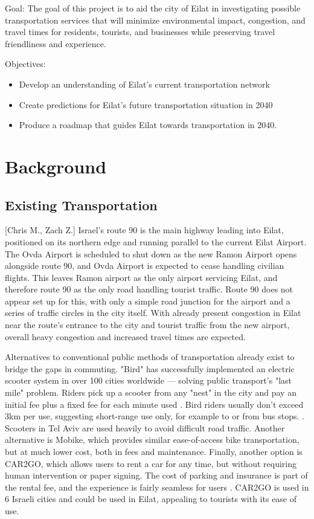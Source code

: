 \documentclass[12pt]{article}                         %
\begin{document}
Goal: The goal of this project is to aid the city of Eilat in investigating possible transportation services that will minimize environmental impact, congestion, and travel times for residents, tourists, and businesses while preserving travel friendliness and experience.

Objectives:
\begin{itemize}
    \item Develop an understanding of Eilat's current transportation network
    
    \item Create predictions for Eilat's future transportation situation in 2040
    
    \item Produce a roadmap that guides Eilat towards transportation in 2040.
\end{itemize}

\newpage
\section{Background}

\subsection{Existing Transportation}[Chris M., Zach Z.]
Israel's route 90 is the main highway leading into Eilat, positioned on its northern edge and running parallel to the current Eilat Airport. The Ovda Airport is scheduled to shut down as the new Ramon Airport opens alongside route 90, and Ovda Airport is expected to cease handling civilian flights. This leaves Ramon airport as the only airport servicing Eilat, and therefore route 90 as the only road handling tourist traffic. Route 90 does not appear set up for this, with only a simple road junction for the airport and a series of traffic circles in the city itself. With already present congestion in Eilat near the route's entrance to the city and tourist traffic from the new airport, overall heavy congestion and increased travel times are expected.

Alternatives to conventional public methods of transportation already exist to bridge the gaps in commuting. "Bird" has successfully implemented an electric scooter system in over 100 cities worldwide --- solving public transport's "last mile" problem. Riders pick up a scooter from any "nest" in the city and pay an initial fee plus a fixed fee for each minute used \cite{BirdIsrael}. Bird riders usually don't exceed 3km per use, suggesting short-range use only, for example to or from bus stops. \cite{MichaelRaz-Chaimovich2018BirdGlobes}. Scooters in Tel Aviv are used heavily to avoid difficult road traffic. Another alternative is Mobike, which provides similar ease-of-access bike transportation, but at much lower cost, both in fees and maintenance. Finally, another option is CAR2GO, which allows users to rent a car for any time, but without requiring human intervention or paper signing. The cost of parking and insurance is part of the rental fee, and the experience is fairly seamless for users \cite{OrenDoriandMeiravMoran2018IsraeliHaaretz.com}. CAR2GO is used in 6 Israeli cities and could be used in Eilat, appealing to tourists with its ease of use.
\end{document}
